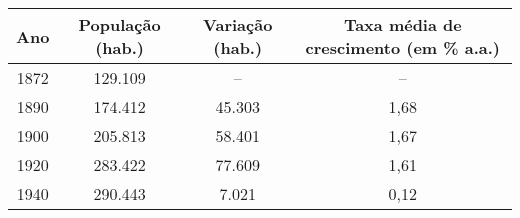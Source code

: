 \begin{table}[!htp]
\centering
{}
{\begin{tabular}{|c|c|c|c|}
\hline 
Ano & População (hab.) & Variação (hab.) & Taxa média de crescimento (em \% a.a.) \\ 
\hline 
1872 & 129.109 & -- & -- \\ 
1890 & 174.412 & 45.303 & 1,68 \\ 
1900 & 205.813 & 58.401 & 1,67 \\ 
1920 & 283.422 & 77.609 & 1,61 \\ 
1940 & 290.443 & 7.021 & 0,12 \\ 
\hline 
\end{tabular} }{
}
\end{table}